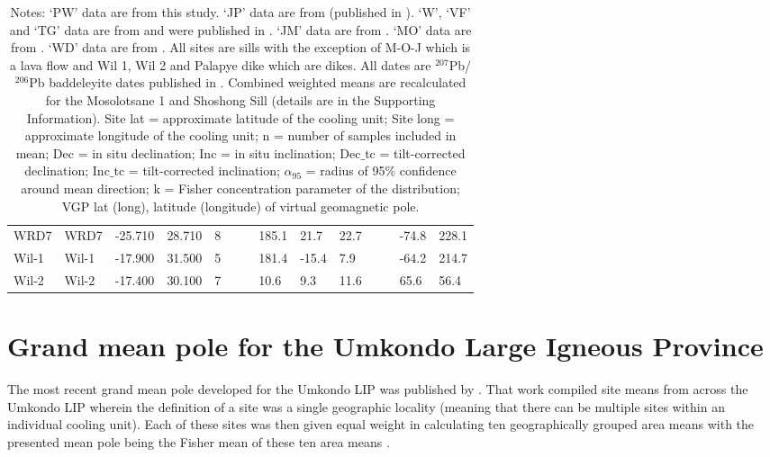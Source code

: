 \documentclass[11pt,letterpaper]{article}
\begin{document}
\begin{table}[!ht]
\begin{adjustwidth}{-0.0in}{0in}
\begin{tiny}
\begin{tabular}{p{2.0 cm}p{1.25 cm}llllllllllll}
WRD7                     &                                 WRD7 &   -25.710 &     28.710 &    8 &     &    &   185.1 &    21.7 &  22.7 &     &      &     -74.8 &      228.1 \\
Wil-1                    &                                Wil-1 &   -17.900 &     31.500 &    5 &     &    &   181.4 &   -15.4 &   7.9 &     &      &     -64.2 &      214.7 \\
Wil-2                    &                                Wil-2 &   -17.400 &     30.100 &    7 &     &    &    10.6 &     9.3 &  11.6 &     &      &      65.6 &       56.4 \\
\hline
\end{tabular}
\caption*{\footnotesize{Notes: `PW' data are from this study. `JP' data are from \cite{Pancake2001a} (published in \citealt{Gose2006a}). `W', `VF' and `TG' data are from \cite{Seidel2004a} and were published in \cite{Gose2006a}. `JM' data are from \cite{Jones1966a}. `MO' data are from \cite{McElhinny1964b}. `WD' data are from \cite{Gose2006a}. All sites are sills with the exception of M-O-J which is a lava flow and Wil 1, Wil 2 and Palapye dike which are dikes. All dates are $^{207}$Pb/$^{206}$Pb baddeleyite dates published in \cite{Hanson2004a}. Combined weighted means are recalculated for the Mosolotsane 1 and Shoshong Sill (details are in the Supporting Information). Site lat = approximate latitude of the cooling unit; Site long =  approximate longitude of the cooling unit; n = number of samples included in mean; Dec = in situ declination; Inc = in situ inclination; Dec$\_$tc = tilt-corrected declination; Inc$\_$tc = tilt-corrected inclination; $\alpha_{95}$ = radius of 95$\%$ confidence around mean direction; k = Fisher concentration parameter of the distribution; VGP lat (long), latitude (longitude) of virtual geomagnetic pole.}}
\end{tiny}
\end{adjustwidth}
\end{table}


\section*{Grand mean pole for the Umkondo Large Igneous Province}

The most recent grand mean pole developed for the Umkondo LIP was published by \cite{Gose2006a}. That work compiled site means from across the Umkondo LIP wherein the definition of a site was a single geographic locality (meaning that there can be multiple sites within an individual cooling unit). Each of these sites was then given equal weight in calculating ten geographically grouped area means with the presented mean pole being the Fisher mean of these ten area means \citep{Gose2006a}.
\end{document}
